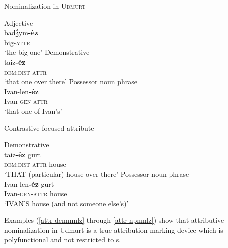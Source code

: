 \begin{exe}
\ex \rm{Nominalization in \textsc{Udmurt} \citep{winkler2001}}
\begin{xlist}
\ex \rm{Adjective}\\
\gll	badǯ́ym\textbf{-ėz}\\
	big-\textsc{attr}\\
\glt	 ‘the big one’
\ex \rm{Demonstrative}\\
\gll	taiz\textbf{-ėz}\\
 	\textsc{dem:dist}-\textsc{attr}\\
\glt	‘that one over there’
\ex \rm{Possessor noun phrase}\\
\gll	Ivan-len\textbf{-ėz}\\
	Ivan-\textsc{gen}-\textsc{attr}\\
\glt	‘that one of Ivan's’
\end{xlist}
\ex \rm{Contrastive focused attribute}
\begin{xlist}
\label{attr demnmlz}
\ex \rm{Demonstrative}\\ 
\gll	taiz\textbf{-ėz} gurt\\
 	\textsc{dem:dist}-\textsc{attr} house\\
\glt	‘THAT (particular) house over there’
\label{attr npnmlz}
\ex \rm{Possessor noun phrase}\\ 
\gll	Ivan-len\textbf{-ėz} gurt\\
	Ivan-\textsc{gen}-\textsc{attr} house\\
\glt	‘IVAN'S house (and not someone else's)’
\end{xlist}
\end{exe}
Examples (\ref{attr demnmlz} through \ref{attr npnmlz}) show that attributive nominalization in Udmurt is a true attribution marking device which is polyfunctional and not restricted to s.

